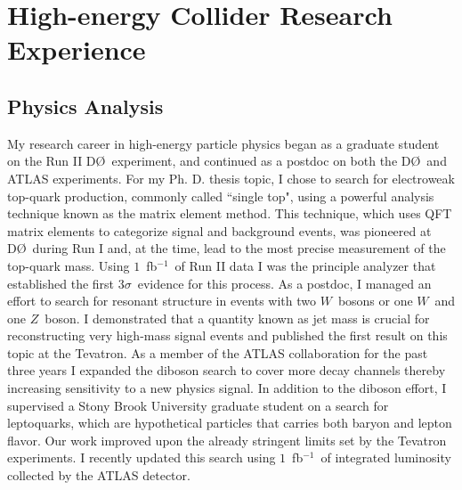 \documentclass[12pt]{article}
\newcommand{\dzero}{D\O}
\begin{document}
\section{High-energy Collider Research Experience}

\subsection{Physics Analysis}
My research career in high-energy particle physics began as a graduate student on the Run II \dzero~experiment, and continued as a postdoc on both the \dzero~and ATLAS experiments. For my Ph. D. thesis topic, I chose to search for electroweak top-quark production, commonly called ``single top", using a powerful analysis technique known as the matrix element method. This technique, which uses QFT matrix elements to categorize signal and background events, was pioneered at \dzero~during Run I and, at the time, lead to the most precise measurement of the top-quark mass. Using $1$~fb$^{-1}$~of Run II data I was the principle analyzer that established the first $3\sigma$~evidence for this process. As a postdoc, I  managed an effort to search for resonant structure in events with two $W$~bosons or one $W$~and one $Z$~boson. I demonstrated that a quantity known as jet mass is crucial for reconstructing very high-mass signal events and published the first result on this topic at the Tevatron. As a member of the ATLAS collaboration for the past three years I expanded the diboson search to cover more decay channels thereby increasing sensitivity to a new physics signal. In addition to the diboson effort, I supervised a Stony Brook University graduate student on a search for leptoquarks, which are hypothetical particles that carries both baryon and lepton flavor. Our work improved upon the already stringent limits set by the Tevatron experiments. I recently updated this search using $1$~fb$^{-1}$~of integrated luminosity collected by the ATLAS detector. 
\end{document}
